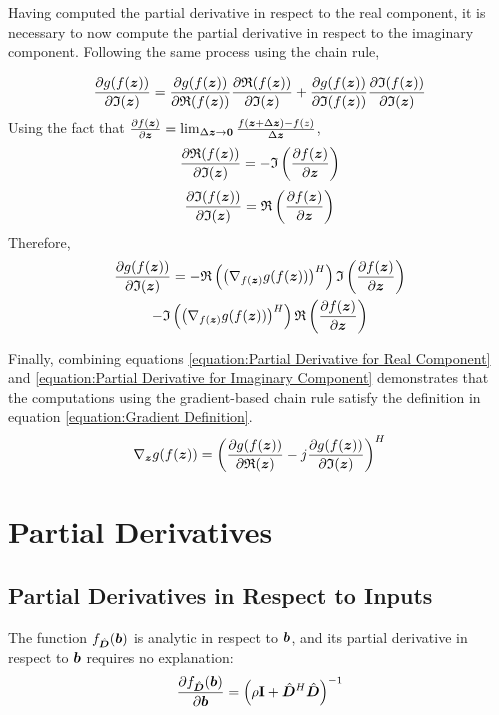 \begin{appendices}
Having computed the partial derivative in respect to the real component, it is necessary to now compute the partial derivative in respect to the imaginary component. Following the same process using the chain rule,

\begin{equation}
\frac{\partial g(f(\bm{z}))}{\partial \mathfrak{I}(\bm{z})} = \frac{\partial g(f(\bm{z}))}{\partial \mathfrak{R}(f(\bm{z}))}\frac{\partial \mathfrak{R}(f(\bm{z}))}{\partial \mathfrak{I}(\bm{z})} + \frac{\partial g(f(\bm{z}))}{\partial \mathfrak{I}(f(\bm{z}))}\frac{\partial \mathfrak{I}(f(\bm{z}))}{\partial \mathfrak{I}(\bm{z})}
\end{equation}
Using the fact that $\frac{\partial f(\bm{z})}{\partial \bm{z}} = \lim_{\Delta \bm{z} \rightarrow \bm{0}} \frac{f(\bm{z} + \Delta \bm{z}) - f(z)}{\Delta \bm{z}}$,
\begin{equation}
\frac{\partial \mathfrak{R}(f(\bm{z}))}{\partial \mathfrak{I}(\bm{z})} = -\mathfrak{I}\left(\frac{\partial f(\bm{z})}{\partial \bm{z}}\right)
\end{equation}
\begin{equation}
\frac{\partial \mathfrak{I}(f(\bm{z}))}{\partial \mathfrak{I}(\bm{z})} = \mathfrak{R}\left(\frac{\partial f(\bm{z})}{\partial \bm{z}}\right)
\end{equation}
Therefore,
\begin{multline}\label{equation:Partial Derivative for Imaginary Component}
\frac{\partial g(f(\bm{z}))}{\partial \mathfrak{I}(\bm{z})} = -\mathfrak{R}\left(\left(\nabla_{f(\bm{z})} g(f(\bm{z}))\right)^H\right)\mathfrak{I}\left(\frac{\partial f(\bm{z})}{\partial \bm{z}}\right) \\- \mathfrak{I}\left(\left(\nabla_{f(\bm{z})} g(f(\bm{z}))\right)^H\right)\mathfrak{R}\left(\frac{\partial f(\bm{z})}{\partial \bm{z}}\right)
\end{multline}

Finally, combining equations \ref{equation:Partial Derivative for Real Component} and \ref{equation:Partial Derivative for Imaginary Component} demonstrates that the computations using the gradient-based chain rule satisfy the definition in equation \ref{equation:Gradient Definition}.
\begin{equation}
\nabla_{\bm{z}} g(f(\bm{z})) = \left(\frac{\partial g(f(\bm{z}))}{\partial \mathfrak{R}(\bm{z})} - j\frac{\partial g(f(\bm{z}))}{\partial \mathfrak{I}(\bm{z})}\right)^H
\end{equation}

\section{Partial Derivatives}

\subsection{Partial Derivatives in Respect to Inputs}
The function $f_{\hat{\bm{D}}}(\bm{b})$ is analytic in respect to $\bm{b}$, and its partial derivative in respect to $\bm{b}$ requires no explanation:
\begin{equation}
\frac{\partial f_{\hat{\bm{D}}}(\bm{b})}{\partial \bm{b}} = \left(\rho{\bf I} + \hat{\bm{D}}^H\hat{\bm{D}}\right)^{-1}
\end{equation}


\end{appendices}
